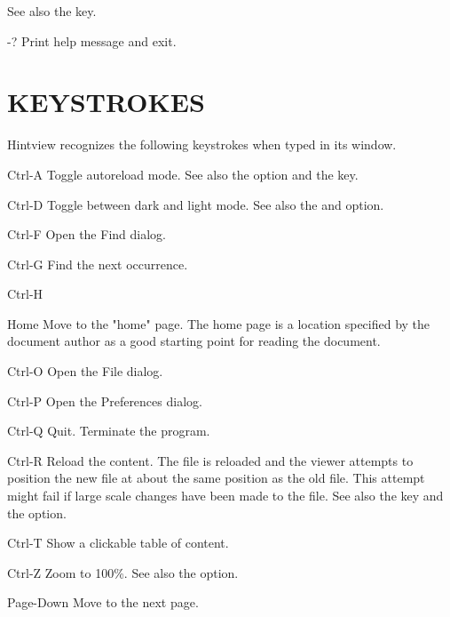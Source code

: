               See also the  key.

\item{-?}     Print help message and exit.
              
\enditemize

\section{KEYSTROKES}
       Hintview recognizes the following keystrokes when typed in its window.

\itemize
\item{Ctrl-A} Toggle autoreload mode. See also the  option  and  the  
              key.

\item{Ctrl-D} Toggle between dark and light mode.
              See also the  and  option.

\item{Ctrl-F} Open the Find dialog.

\item{Ctrl-G} Find the next occurrence.

\item{Ctrl-H}\item{Home}
              Move to the "home" page. The home page is a  location  specified
              by  the document author as a good starting point for reading the
              document.
  
\item{Ctrl-O} Open the File dialog.

\item{Ctrl-P} Open the Preferences dialog.
  
\item{Ctrl-Q} Quit. Terminate the program.

\item{Ctrl-R} Reload the content. The file is reloaded and the viewer attempts
              to position the new file at about the same position as  the  old
              file.  This  attempt might fail if large scale changes have been
              made to the file. See also the  key and the  option.

\item{Ctrl-T} Show a clickable table of content.

\item{Ctrl-Z} Zoom to 100\%. See also the  option.


\item{Page-Down}
              Move to the next page.

